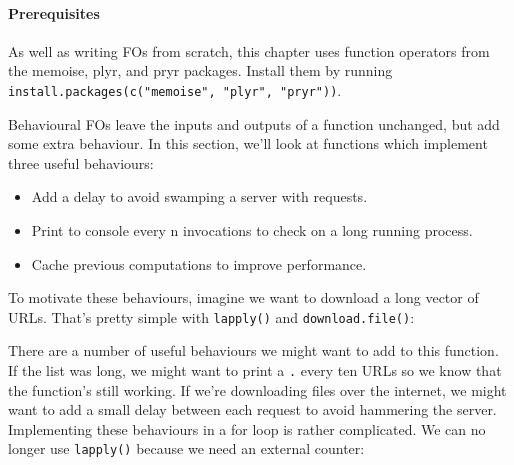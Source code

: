 \paragraph{Prerequisites}

As well as writing FOs from scratch, this chapter uses function
operators from the memoise, plyr, and pryr packages. Install them by
running \texttt{install.packages(c("memoise", "plyr", "pryr"))}.


Behavioural FOs leave the inputs and outputs of a function unchanged,
but add some extra behaviour. In this section, we'll look at functions
which implement three useful behaviours:

\begin{itemize}
\itemsep1pt\parskip0pt
\item
  Add a delay to avoid swamping a server with requests.
\item
  Print to console every n invocations to check on a long running
  process.
\item
  Cache previous computations to improve performance.
\end{itemize}

To motivate these behaviours, imagine we want to download a long vector
of URLs. That's pretty simple with \texttt{lapply()} and
\texttt{download.file()}:

\begin{Shaded}
\begin{Highlighting}[]
\StringTok{ }
\NormalTok{\}}
\end{Highlighting}
\end{Shaded}

There are a number of useful behaviours we might want to add to this
function. If the list was long, we might want to print a \texttt{.}
every ten URLs so we know that the function's still working. If we're
downloading files over the internet, we might want to add a small delay
between each request to avoid hammering the server. Implementing these
behaviours in a for loop is rather complicated. We can no longer use
\texttt{lapply()} because we need an external counter:

